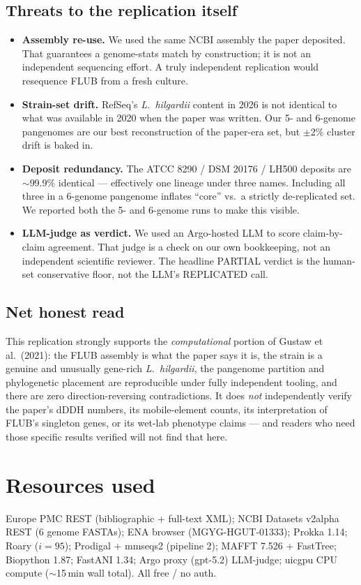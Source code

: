\documentclass[11pt,letterpaper]{article}
\begin{document}
\subsection{Threats to the replication itself}
\begin{itemize}[leftmargin=1.2em]
  \item \textbf{Assembly re-use.} We used the same NCBI assembly the paper deposited. That guarantees a genome-stats match by construction; it is not an independent sequencing effort. A truly independent replication would resequence FLUB from a fresh culture.
  \item \textbf{Strain-set drift.} RefSeq's \emph{L.\ hilgardii} content in 2026 is not identical to what was available in 2020 when the paper was written. Our 5- and 6-genome pangenomes are our best reconstruction of the paper-era set, but $\pm$2\% cluster drift is baked in.
  \item \textbf{Deposit redundancy.} The ATCC 8290 / DSM 20176 / LH500 deposits are $\sim$99.9\% identical --- effectively one lineage under three names. Including all three in a 6-genome pangenome inflates ``core'' vs.\ a strictly de-replicated set. We reported both the 5- and 6-genome runs to make this visible.
  \item \textbf{LLM-judge as verdict.} We used an Argo-hosted LLM to score claim-by-claim agreement. That judge is a check on our own bookkeeping, not an independent scientific reviewer. The headline PARTIAL verdict is the human-set conservative floor, not the LLM's REPLICATED call.
\end{itemize}

\subsection{Net honest read}
This replication strongly supports the \emph{computational} portion of Gustaw et al.\ (2021): the FLUB assembly is what the paper says it is, the strain is a genuine and unusually gene-rich \emph{L.\ hilgardii}, the pangenome partition and phylogenetic placement are reproducible under fully independent tooling, and there are zero direction-reversing contradictions. It does \emph{not} independently verify the paper's dDDH numbers, its mobile-element counts, its interpretation of FLUB's singleton genes, or its wet-lab phenotype claims --- and readers who need those specific results verified will not find that here.

\section{Resources used}
Europe PMC REST (bibliographic + full-text XML); NCBI Datasets v2alpha REST (6 genome FASTAs); ENA browser (MGYG-HGUT-01333); Prokka 1.14; Roary ($i=95$); Prodigal + mmseqs2 (pipeline 2); MAFFT 7.526 + FastTree; Biopython 1.87; FastANI 1.34; Argo proxy (gpt-5.2) LLM-judge; uicgpu CPU compute ($\sim$15\,min wall total). All free / no auth.
\end{document}
